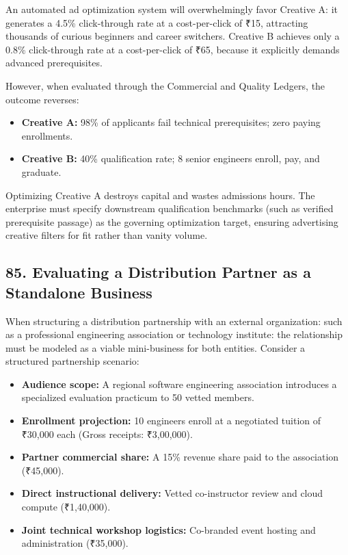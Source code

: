 An automated ad optimization system will overwhelmingly favor Creative A: it generates a 4.5\% click-through rate at a cost-per-click of ₹15, attracting thousands of curious beginners and career switchers. Creative B achieves only a 0.8\% click-through rate at a cost-per-click of ₹65, because it explicitly demands advanced prerequisites.

However, when evaluated through the Commercial and Quality Ledgers, the outcome reverses:
\begin{itemize}[leftmargin=*,itemsep=1pt]
  \item \textbf{Creative A:} 98\% of applicants fail technical prerequisites; zero paying enrollments.
  \item \textbf{Creative B:} 40\% qualification rate; 8 senior engineers enroll, pay, and graduate.
\end{itemize}

Optimizing Creative A destroys capital and wastes admissions hours. The enterprise must specify downstream qualification benchmarks (such as verified prerequisite passage) as the governing optimization target, ensuring advertising creative filters for fit rather than vanity volume.

\subsection*{85. Evaluating a Distribution Partner as a Standalone Business}

When structuring a distribution partnership with an external organization: such as a professional engineering association or technology institute: the relationship must be modeled as a viable mini-business for both entities. Consider a structured partnership scenario:
\begin{itemize}[leftmargin=*,itemsep=1pt]
  \item \textbf{Audience scope:} A regional software engineering association introduces a specialized evaluation practicum to 50 vetted members.
  \item \textbf{Enrollment projection:} 10 engineers enroll at a negotiated tuition of ₹30,000 each (Gross receipts: ₹3,00,000).
  \item \textbf{Partner commercial share:} A 15\% revenue share paid to the association (₹45,000).
  \item \textbf{Direct instructional delivery:} Vetted co-instructor review and cloud compute (₹1,40,000).
  \item \textbf{Joint technical workshop logistics:} Co-branded event hosting and administration (₹35,000).
\end{itemize}

